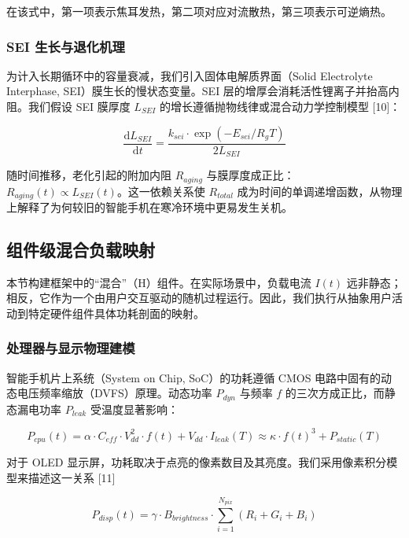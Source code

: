 \documentclass[11pt,a4paper]{ctexart}
\begin{document}
在该式中，第一项表示焦耳发热，第二项对应对流散热，第三项表示可逆熵热。

\subsubsection{SEI 生长与退化机理}

为计入长期循环中的容量衰减，我们引入固体电解质界面（Solid Electrolyte Interphase, SEI）膜生长的慢状态变量。SEI 层的增厚会消耗活性锂离子并抬高内阻。我们假设 SEI 膜厚度 $L_{SEI}$ 的增长遵循抛物线律或混合动力学控制模型 [10]：

\begin{equation}
\frac{\mathrm{d}L_{SEI}}{\mathrm{d}t} = \frac{k_{sei} \cdot \exp\left(-E_{sei}/R_g T\right)}{2 L_{SEI}}
\end{equation}

随时间推移，老化引起的附加内阻 $R_{aging}$ 与膜厚度成正比：$R_{aging}(t) \propto L_{SEI}(t)$。这一依赖关系使 $R_{total}$ 成为时间的单调递增函数，从物理上解释了为何较旧的智能手机在寒冷环境中更易发生关机。

\subsection{组件级混合负载映射}

本节构建框架中的“混合”（H）组件。在实际场景中，负载电流 $I(t)$ 远非静态；相反，它作为一个由用户交互驱动的随机过程运行。因此，我们执行从抽象用户活动到特定硬件组件具体功耗剖面的映射。

\subsubsection{处理器与显示物理建模}

智能手机片上系统（System on Chip, SoC）的功耗遵循 CMOS 电路中固有的动态电压频率缩放（DVFS）原理。动态功率 $P_{dyn}$ 与频率 $f$ 的三次方成正比，而静态漏电功率 $P_{leak}$ 受温度显著影响：

\begin{equation}
P_{cpu}(t) = \alpha \cdot C_{eff} \cdot V_{dd}^2 \cdot f(t) + V_{dd} \cdot I_{leak}(T) \approx \kappa \cdot f(t)^3 + P_{static}(T)
\end{equation}

对于 OLED 显示屏，功耗取决于点亮的像素数目及其亮度。我们采用像素积分模型来描述这一关系 [11]

\begin{equation}
P_{disp}(t) = \gamma \cdot B_{brightness} \cdot \sum_{i=1}^{N_{pix}} (R_i + G_i + B_i)
\end{equation}
\end{document}
